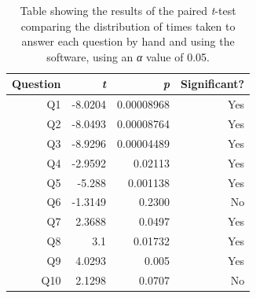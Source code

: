\documentclass[12pt,twoside,notitlepage,xetex]{report}
\begin{document}
\begin{center}
\begin{table}[H]
\begin{center}
\begin{tabular}{|r|r|r|r|}
\hline
Question & \emph{t} & \emph{p} & Significant?\\ \hline \hline
Q1 & -8.0204 & 0.00008968 & Yes\\ \hline
Q2 & -8.0493 & 0.00008764 & Yes\\ \hline
Q3 & -8.9296 & 0.00004489 & Yes\\ \hline
Q4 & -2.9592 & 0.02113 & Yes\\ \hline
Q5 & -5.288 & 0.001138 & Yes\\ \hline
Q6 & -1.3149 & 0.2300 & No\\ \hline
Q7 & 2.3688 & 0.0497 & Yes\\ \hline
Q8 & 3.1 & 0.01732 & Yes\\ \hline
Q9 & 4.0293 & 0.005 & Yes\\ \hline
Q10 & 2.1298 & 0.0707 & No\\
\hline
\end{tabular}
\end{center}
\caption{Table showing the results of the paired \emph{t}-test comparing the distribution of times taken to answer each question by hand and using the software, using an \emph{α} value of 0.05.}
\end{table}
\end{center}
\end{document}
